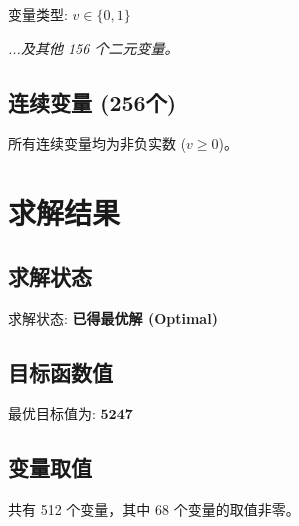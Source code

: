 \documentclass[a4paper,10pt]{article}
\begin{document}
变量类型: $v \in \{0,1\}$

\textit{...及其他 156 个二元变量。}

\subsection{连续变量 (256个)}

所有连续变量均为非负实数 ($v \geq 0$)。

\section{求解结果}

\subsection{求解状态}

求解状态: \textbf{已得最优解 (Optimal)}

\subsection{目标函数值}

最优目标值为: $\mathbf{5247}$

\subsection{变量取值}

共有 512 个变量，其中 68 个变量的取值非零。
\end{document}

